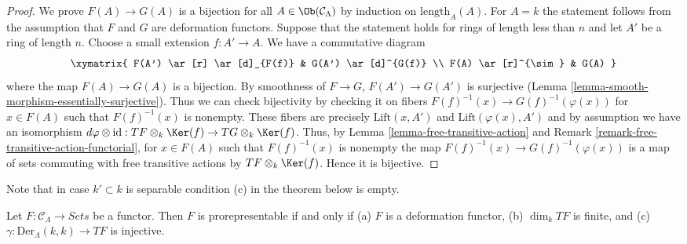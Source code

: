 \begin{proof}
We prove $F(A) \to G(A)$ is a bijection for all $A \in
\Ob(\mathcal{C}_\Lambda)$ by induction on
$\text{length}_A(A)$.  For $A = k$ the statement follows from the
assumption that $F$ and $G$ are deformation functors. Suppose that the
statement holds for rings of length less than $n$ and let $A'$ be a ring of
length $n$. Choose a small extension $f : A' \to A$.  We have a
commutative diagram
$$
\xymatrix{
F(A') \ar[r] \ar[d]_{F(f)} & G(A') \ar[d]^{G(f)} \\
F(A) \ar[r]^{\sim} & G(A)
}
$$
where the map $F(A) \to G(A)$ is a bijection.  By smoothness of $F
\to G$, $F(A') \to G(A')$ is surjective (Lemma
\ref{lemma-smooth-morphism-essentially-surjective}).  Thus we can check
bijectivity by checking it on fibers $F(f)^{-1}(x) \to
G(f)^{-1}(\varphi(x))$ for $x \in F(A)$ such that $F(f)^{-1}(x)$ is nonempty.
These fibers are precisely $\text{Lift}(x, A')$ and
$\text{Lift}(\varphi(x), A')$ and by assumption we have an isomorphism
$d\varphi \otimes \text{id} :
TF \otimes_k \Ker(f)  \to TG \otimes_k \Ker(f)$.
Thus, by
Lemma \ref{lemma-free-transitive-action} and
Remark \ref{remark-free-transitive-action-functorial},
for $x \in F(A)$ such that $F(f)^{-1}(x)$ is nonempty the map
$F(f)^{-1}(x) \to G(f)^{-1}(\varphi(x))$ is a map of sets commuting
with free transitive actions by $TF \otimes_k \Ker(f)$.
Hence it is bijective.
\end{proof}

\noindent
Note that in case $k' \subset k$ is separable condition (c) in
the theorem below is empty.

\begin{theorem}
\label{theorem-Schlessinger-prorepresentability}
Let $F: \mathcal{C}_\Lambda \to \textit{Sets}$ be a functor.
Then $F$ is prorepresentable if and only if
(a) $F$ is a deformation functor,
(b) $\dim_k TF$ is finite, and (c) $\gamma : \text{Der}_\Lambda(k, k) \to TF$
is injective.
\end{theorem}

